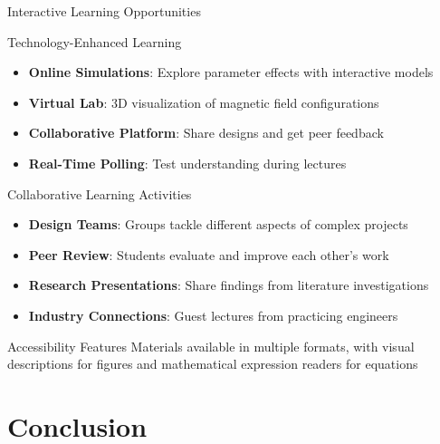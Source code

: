 \begin{frame}{Interactive Learning Opportunities}
    \begin{block}{Technology-Enhanced Learning}
        \begin{itemize}
            \item \textbf{Online Simulations}: Explore parameter effects with interactive models
            \item \textbf{Virtual Lab}: 3D visualization of magnetic field configurations
            \item \textbf{Collaborative Platform}: Share designs and get peer feedback
            \item \textbf{Real-Time Polling}: Test understanding during lectures
        \end{itemize}
    \end{block}
    
    \begin{block}{Collaborative Learning Activities}
        \begin{itemize}
            \item \textbf{Design Teams}: Groups tackle different aspects of complex projects
            \item \textbf{Peer Review}: Students evaluate and improve each other's work
            \item \textbf{Research Presentations}: Share findings from literature investigations
            \item \textbf{Industry Connections}: Guest lectures from practicing engineers
        \end{itemize}
    \end{block}
    
    \begin{alertblock}{Accessibility Features}
        Materials available in multiple formats, with visual descriptions for figures and mathematical expression readers for equations
    \end{alertblock}
\end{frame}

\section{Conclusion}


